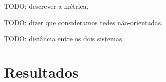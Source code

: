 \documentclass{acm_proc_article-sp}
\begin{document}
TODO: descrever a métrica.

TODO: dizer que consideramos redes não-orientadas.

TODO: distância entre os dois sistemas.









\section{Resultados} \label{sec:resultados}
\end{document}
